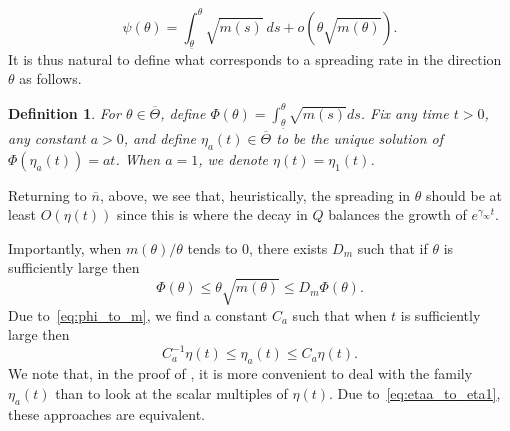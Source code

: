 \documentclass[11pt]{article}    %
\newtheorem{definition}[theorem]{Definition}
\begin{document}
\begin{equation}\label{eq:Q_asymptotics}
	\psi(\theta) = \int_{\underline{\theta}}^\theta \sqrt{m(s)}~ds + o(\theta \sqrt{m(\theta)}).%
\end{equation}
%
It is thus natural to define what corresponds to a spreading rate in the direction $\theta$ as follows.

\begin{definition}
For $\theta \in \overline\Theta$, define $\Phi(\theta) = \int_{\underline{\theta}}^\theta \sqrt{m(s)}ds$.  Fix any time $t>0$, any constant $a>0$, and define $\eta_a(t) \in \overline{\Theta}$ to be the unique solution of $\Phi(\eta_a(t)) = at$. When $a=1$, we denote $\eta(t) = \eta_1(t)$.
\end{definition}

Returning to $\overline n$, above, we see that, heuristically, the spreading in $\theta$ should be at least $O(\eta(t))$ since this is where the decay in $Q$ balances the growth of $e^{\gamma_\infty t}$.

Importantly, when $m(\theta)/\theta$ tends to $0$, there exists $D_m$ such that if $\theta$ is sufficiently large then
\begin{equation}\label{eq:phi_to_m}
	\Phi(\theta)
		\leq  \theta \sqrt{m(\theta)}
		\leq D_m \Phi(\theta).
\end{equation}		
Due to~\eqref{eq:phi_to_m}, we find a constant $C_a$ such that when $t$ is sufficiently large then
\begin{equation}\label{eq:etaa_to_eta1}
		C_a^{-1} \eta(t)
			\leq \eta_a(t)
			\leq C_a \eta(t).
\end{equation}
We note that, in the proof of , it is more convenient to deal with the family $\eta_a(t)$ than to look at the scalar multiples of $\eta(t)$.  Due to~\eqref{eq:etaa_to_eta1}, these approaches are equivalent.
\end{document}
